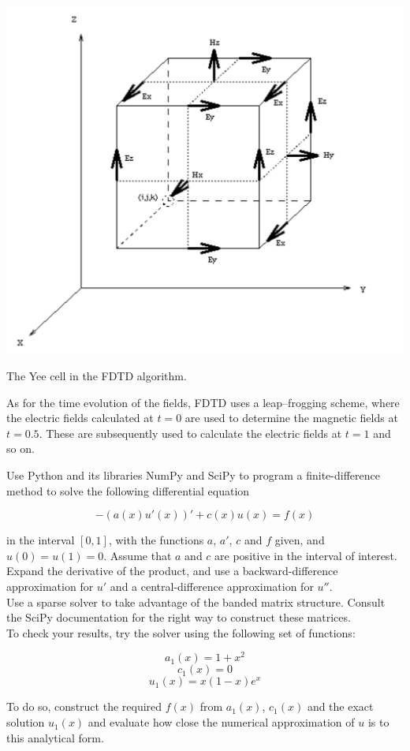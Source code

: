 \begin{marginfigure}
\centering
\includegraphics{numeric/figures/yeecell}
\caption{The Yee cell in the FDTD algorithm.}
\label{fig-yee}
\end{marginfigure}

As for the time evolution of the fields, FDTD uses a leap--frogging scheme, where the electric fields calculated at $t=0$ are used to determine the magnetic fields at $t=0.5$. These are subsequently used to calculate the electric fields at $t=1$ and so on.


\begin{exer}
Use Python and its libraries NumPy and SciPy to program a finite-difference method to solve the following differential equation

$$ -\left(a(x) u'(x) \right)' + c(x)u(x) = f(x)$$

in the interval $[0,1]$, with the functions $a$, $a'$, $c$ and $f$ given, and $u(0) = u(1) = 0$. Assume that $a$ and $c$ are positive in the interval of interest.\\

Expand the derivative of the product, and use a backward-difference approximation for $u'$ and a central-difference approximation for $u''$. \\

Use a sparse solver to take advantage of the banded matrix structure. Consult the SciPy documentation for the right way to construct these matrices. \\

To check your results, try the solver using the following set of functions:

$$a_1(x) = 1 + x^2$$
$$c_1(x) = 0$$
$$u_1(x) = x(1-x) e^x $$

To do so, construct the required $f(x)$ from $a_1(x)$, $c_1(x)$ and the exact solution $u_1(x)$ and evaluate how close the numerical approximation of $u$ is to this analytical form.

\end{exer}



